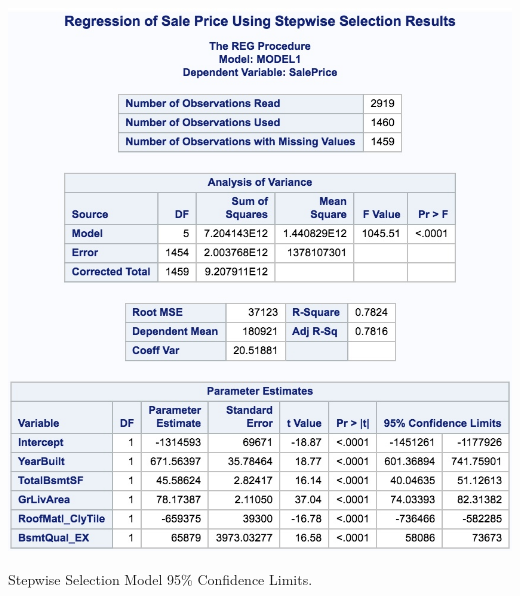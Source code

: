 \documentclass[11pt]{scrartcl} %
\begin{document}
\hrulefill
\begin{table}[H] %
	\centering %
	\includegraphics[scale=.3]{../graphics/A2SWCI}
	\caption{Stepwise Selection Model 95\% Confidence Limits.}
	\label{tab:A2SWCI}
\end{table}
\hrulefill
\end{document}
